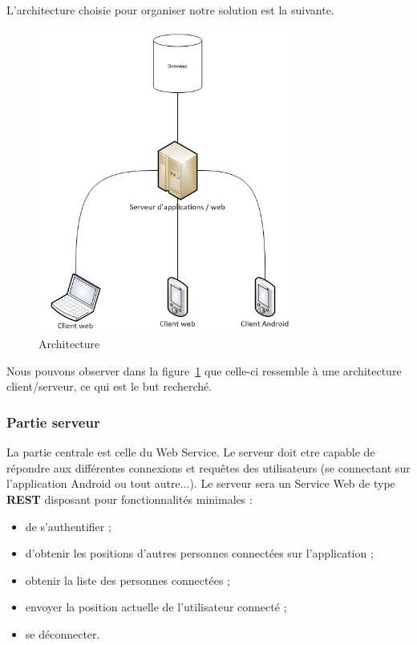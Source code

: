 L'architecture choisie pour organiser notre solution est la suivante.

\begin{figure}[H]
    \centering
    \includegraphics[height=10cm]{../infrastructure.png}
    \caption{Architecture}
    \label{architecture}
\end{figure}

Nous pouvons observer dans la figure~\ref{architecture} que celle-ci ressemble à une architecture client/serveur, ce qui est le but recherché.

\subsubsection{Partie serveur}
La partie centrale est celle du Web Service. Le serveur doit etre capable de répondre aux différentes connexions et requêtes des utilisateurs (se connectant sur l'application Android ou tout autre...). Le serveur sera un Service Web de type \textbf{REST} disposant pour fonctionnalités minimales :
\begin{itemize}
    \item de s'authentifier ;
    \item d'obtenir les positions d'autres personnes connectées sur l'application ;
    \item obtenir la liste des personnes connectées ;
    \item envoyer la position actuelle de l'utilisateur connecté ;
    \item se déconnecter.
\end{itemize}

